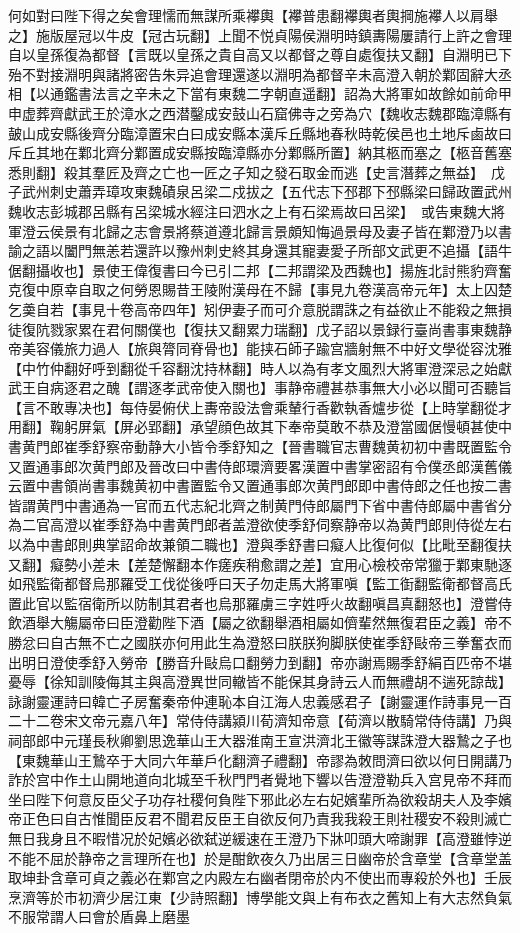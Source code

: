何如對曰陛下得之矣會理懦而無謀所乘襻輿【襻普患翻襻輿者輿掆施襻人以肩舉之】施版屋冠以牛皮【冠古玩翻】上聞不悦貞陽侯淵明時鎮夀陽屢請行上許之會理自以皇孫復為都督【言既以皇孫之貴自高又以都督之尊自處復扶又翻】自淵明已下殆不對接淵明與諸將密告朱异追會理還遂以淵明為都督辛未高澄入朝於鄴固辭大丞相【以通鑑書法言之辛未之下當有東魏二字朝直遥翻】詔為大將軍如故餘如前命甲申虚葬齊獻武王於漳水之西潜鑿成安鼓山石窟佛寺之旁為穴【魏收志魏郡臨漳縣有皷山成安縣後齊分臨漳置宋白曰成安縣本漢斥丘縣地春秋時乾侯邑也土地斥鹵故曰斥丘其地在鄴北齊分鄴置成安縣按臨漳縣亦分鄴縣所置】納其柩而塞之【柩音舊塞悉則翻】殺其羣匠及齊之亡也一匠之子知之發石取金而逃【史言潛葬之無益】　戊子武州刺史蕭弄璋攻東魏磧泉呂梁二戍拔之【五代志下邳郡下邳縣梁曰歸政置武州魏收志彭城郡呂縣有呂梁城水經注曰泗水之上有石梁焉故曰呂梁】　或告東魏大將軍澄云侯景有北歸之志會景將蔡道遵北歸言景頗知悔過景母及妻子皆在鄴澄乃以書諭之語以闔門無恙若還許以豫州刺史終其身還其寵妻愛子所部文武更不追攝【語牛倨翻攝收也】景使王偉復書曰今已引二邦【二邦謂梁及西魏也】揚旌北討熊豹齊奮克復中原幸自取之何勞恩賜昔王陵附漢母在不歸【事見九卷漢高帝元年】太上囚楚乞羮自若【事見十卷高帝四年】矧伊妻子而可介意脱謂誅之有益欲止不能殺之無損徒復阬戮家累在君何關僕也【復扶又翻累力瑞翻】戊子詔以景録行臺尚書事東魏静帝美容儀旅力過人【旅與膂同脊骨也】能挟石師子踰宫牆射無不中好文學從容沈雅【中竹仲翻好呼到翻從千容翻沈持林翻】時人以為有孝文風烈大將軍澄深忌之始獻武王自病逐君之醜【謂逐孝武帝使入關也】事静帝禮甚恭事無大小必以聞可否聽旨【言不敢專决也】每侍晏俯伏上夀帝設法會乘輦行香歡執香爐步從【上時掌翻從才用翻】鞠躬屏氣【屏必郢翻】承望顔色故其下奉帝莫敢不恭及澄當國倨慢頓甚使中書黄門郎崔季舒察帝動静大小皆令季舒知之【晉書職官志曹魏黄初初中書既置監令又置通事郎次黄門郎及晉改曰中書侍郎環濟要畧漢置中書掌密詔有令僕丞郎漢舊儀云置中書領尚書事魏黄初中書置監令又置通事郎次黄門郎即中書侍郎之任也按二書皆謂黄門中書通為一官而五代志紀北齊之制黄門侍郎屬門下省中書侍郎屬中書省分為二官高澄以崔季舒為中書黄門郎者盖澄欲使季舒伺察静帝以為黄門郎則侍從左右以為中書郎則典掌詔命故兼領二職也】澄與季舒書曰癡人比復何似【比毗至翻復扶又翻】癡勢小差未【差楚懈翻本作瘥疾稍愈謂之差】宜用心檢校帝常獵于鄴東馳逐如飛監衛都督烏那羅受工伐從後呼曰天子勿走馬大將軍嗔【監工衘翻監衛都督高氏置此官以監宿衛所以防制其君者也烏那羅虜三字姓呼火故翻嗔昌真翻怒也】澄嘗侍飲酒舉大觴屬帝曰臣澄勸陛下酒【屬之欲翻舉酒相屬如儕輩然無復君臣之義】帝不勝忿曰自古無不亡之國朕亦何用此生為澄怒曰朕朕狗脚朕使崔季舒敺帝三拳奮衣而出明日澄使季舒入勞帝【勝音升敺烏口翻勞力到翻】帝亦謝焉賜季舒絹百匹帝不堪憂辱【徐知訓陵侮其主與高澄異世同轍皆不能保其身詩云人而無禮胡不遄死諒哉】詠謝靈運詩曰韓亡子房奮秦帝仲連恥本自江海人忠義感君子【謝靈運作詩事見一百二十二卷宋文帝元嘉八年】常侍侍講潁川荀濟知帝意【荀濟以散騎常侍侍講】乃與祠部郎中元瑾長秋卿劉思逸華山王大器淮南王宣洪濟北王徽等謀誅澄大器鷙之子也【東魏華山王鷙卒于大同六年華戶化翻濟子禮翻】帝謬為敇問濟曰欲以何日開講乃詐於宫中作土山開地道向北城至千秋門門者覺地下響以告澄澄勒兵入宫見帝不拜而坐曰陛下何意反臣父子功存社稷何負陛下邪此必左右妃嬪輩所為欲殺胡夫人及李嬪帝正色曰自古惟聞臣反君不聞君反臣王自欲反何乃責我我殺王則社稷安不殺則滅亡無日我身且不暇惜况於妃嬪必欲弑逆緩速在王澄乃下牀叩頭大啼謝罪【高澄雖悖逆不能不屈於静帝之言理所在也】於是酣飲夜久乃出居三日幽帝於含章堂【含章堂盖取坤卦含章可貞之義必在鄴宫之内殿左右幽者閉帝於内不使出而專殺於外也】壬辰烹濟等於市初濟少居江東【少詩照翻】博學能文與上有布衣之舊知上有大志然負氣不服常謂人曰會於盾鼻上磨墨